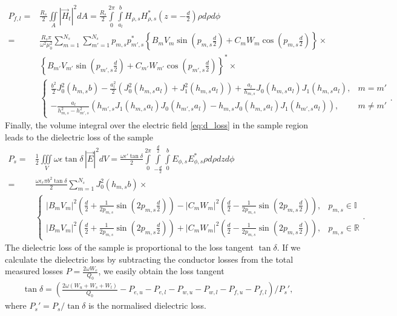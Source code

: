 \begin{align}
P_{f,l}=&\frac{R_s}{2}\iint\limits_\mathit{A}|\vec{H}_t|^2\mathit{dA}=\frac{R_s}{2}\int\limits_0^{2\pi}\int\limits_{a_l}^b H_{\rho,s}H_{\rho,s}^*\left(z=-\frac{d}{2}\right)\rho \mathit{d\rho d\phi}\\
=& \frac{R_s\pi}{\omega^2\mu_0^2}\sum\limits_{m=1}^{N_s}\sum\limits_{m'=1}^{N_s}p_{m,s}p_{m',s}^* 
 \left\lbrace B_mV_m\sin(p_{m,s}\frac{d}{2})+C_mW_m\cos(p_{m,s}\frac{d}{2})\right\rbrace\times\nonumber\\
 &\left\lbrace B_{m'}V_{m'}\sin(p_{m',s}\frac{d}{2})+C_{m'}W_{m'}\cos(p_{m',s}\frac{d}{2})\right\rbrace^*\times\\
 &\begin{cases}
 \frac{b^2}{2}J_0^2(h_{m,s}b)-\frac{a_l^2}{2}(J_0^2(h_{m,s}a_l)+J_1^2(h_{m,s}a_l))+\frac{a_l}{h_{m,s}}J_0(h_{m,s}a_l)J_1(h_{m,s}a_l),& m=m'\\
 -\frac{a_l}{h_{m,s}^2-h_{m',s}^2}(h_{m',s}J_1(h_{m,s}a_l)J_0(h_{m',s}a_l)-h_{m,s}J_0(h_{m,s}a_l)J_1(h_{m',s}a_l)),& m\neq m'
 \end{cases}\text{.}\nonumber
\end{align}
Finally, the volume integral over the electric field \eqref{eq:d_loss} in the sample region leads to the dielectric loss of the sample
\begin{align}
P_s=&\frac{1}{2}\iiint\limits_{\mathit{V}}\omega\epsilon\tan\delta\,|\vec{E}|^2\mathit{dV}
   =\frac{\omega\epsilon'\tan\delta}{2}\int\limits_0^{2\pi}\int\limits_{-\frac{d}{2}}^{\frac{d}{2}}\int\limits_0^bE_{\phi,s}E_{\phi,s}^*\rho \mathit{d\rho dz d\phi}\nonumber\\
   =&\frac{\omega\epsilon_r\pi b^2\tan\delta}{2}\sum\limits_{m=1}^{N_s}J_0^2(h_{m,s}b)\times\\
   &\begin{cases}
   |B_mV_m|^2\left(\frac{d}{2}+\frac{1}{2p_{m,s}}\sin\left(2p_{m,s}\frac{d}{2}\right)\right)-|C_mW_m|^2\left(\frac{d}{2}-\frac{1}{2p_{m,s}}\sin\left(2p_{m,s}\frac{d}{2}\right)\right), & p_{m,s}\in \mathbb{I} \\
   |B_mV_m|^2\left(\frac{d}{2}+\frac{1}{2p_{m,s}}\sin\left(2p_{m,s}\frac{d}{2}\right)\right)+|C_mW_m|^2\left(\frac{d}{2}-\frac{1}{2p_{m,s}}\sin\left(2p_{m,s}\frac{d}{2}\right)\right), & p_{m,s}\in \mathbb{R}
   \end{cases}\text{.}\nonumber
\end{align}
The dielectric loss of the sample is proportional to the loss tangent $\tan\delta$. If we calculate the dielectric loss by subtracting the conductor losses from the total measured losses $P=\frac{2\omega W_e}{Q_0}$, we easily obtain the loss tangent
\begin{align}\label{eq:tand}
\tan\delta=\left(\frac{2\omega(W_u+W_s+W_l)}{Q_0}-P_{e,u}-P_{e,l}-P_{w,u}-P_{w,l}-P_{f,u}-P_{f,l}\right)/P_s'\text{,}
\end{align}
where $P_s'=P_s/\tan\delta$ is the normalised dielectric loss.
